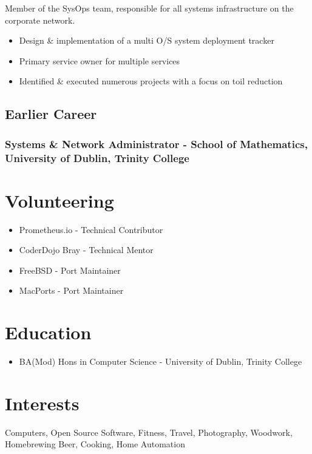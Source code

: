 \documentclass[a4paper, 10pt] {article}
\begin{document}
Member of the SysOps team, responsible for all systems infrastructure on the corporate network.

\begin{itemize}
  \item Design \& implementation of a multi O/S system deployment tracker
  \item Primary service owner for multiple services
  \item Identified \& executed numerous projects with a focus on toil reduction
\end{itemize}

\subsection*{Earlier Career}

\subsubsection*{Systems \& Network Administrator - School of Mathematics, University of Dublin, Trinity College}

\hrulefill

\section*{Volunteering}

\begin{itemize}
  \item Prometheus.io - Technical Contributor
  \item CoderDojo Bray - Technical Mentor
  \item FreeBSD - Port Maintainer
  \item MacPorts - Port Maintainer
\end{itemize}

\hrulefill

\section*{Education}

\begin{itemize}
  \item BA(Mod) Hons in Computer Science - University of Dublin, Trinity College
\end{itemize}

\hrulefill

\section*{Interests}

Computers, Open Source Software, Fitness, Travel, Photography, Woodwork,
Homebrewing Beer, Cooking, Home Automation
\end{document}
